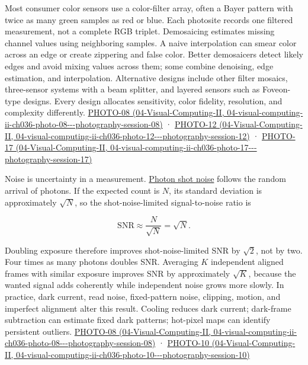 Most consumer color sensors use a color-filter array, often a Bayer pattern with twice as many green samples as red or blue. Each photosite records one filtered measurement, not a complete RGB triplet. Demosaicing estimates missing channel values using neighboring samples. A naive interpolation can smear color across an edge or create zippering and false color. Better demosaicers detect likely edges and avoid mixing values across them; some combine denoising, edge estimation, and interpolation. Alternative designs include other filter mosaics, three-sensor systems with a beam splitter, and layered sensors such as Foveon-type designs. Every design allocates sensitivity, color fidelity, resolution, and complexity differently. \href{../04-Visual-Computing-II/main.pdf\#nameddest=04-visual-computing-ii-ch036-photo-08---photography-session-08}{PHOTO-08 (04-Visual-Computing-II, 04-visual-computing-ii-ch036-photo-08-\/-\/-photography-session-08)} · \href{../04-Visual-Computing-II/main.pdf\#nameddest=04-visual-computing-ii-ch036-photo-12---photography-session-12}{PHOTO-12 (04-Visual-Computing-II, 04-visual-computing-ii-ch036-photo-12-\/-\/-photography-session-12)} · \href{../04-Visual-Computing-II/main.pdf\#nameddest=04-visual-computing-ii-ch036-photo-17---photography-session-17}{PHOTO-17 (04-Visual-Computing-II, 04-visual-computing-ii-ch036-photo-17-\/-\/-photography-session-17)}

Noise is uncertainty in a measurement. \hyperref[appendix-92d45cdf2afc]{Photon shot noise} follows the random arrival of photons. If the expected count is \(N\), its standard deviation is approximately \(\sqrt{N}\), so the shot-noise-limited signal-to-noise ratio is

\[
\mathrm{SNR}\approx\frac{N}{\sqrt{N}}=\sqrt{N}.
\]

Doubling exposure therefore improves shot-noise-limited SNR by \(\sqrt 2\), not by two. Four times as many photons doubles SNR. Averaging \(K\) independent aligned frames with similar exposure improves SNR by approximately \(\sqrt K\), because the wanted signal adds coherently while independent noise grows more slowly. In practice, dark current, read noise, fixed-pattern noise, clipping, motion, and imperfect alignment alter this result. Cooling reduces dark current; dark-frame subtraction can estimate fixed dark patterns; hot-pixel maps can identify persistent outliers. \href{../04-Visual-Computing-II/main.pdf\#nameddest=04-visual-computing-ii-ch036-photo-08---photography-session-08}{PHOTO-08 (04-Visual-Computing-II, 04-visual-computing-ii-ch036-photo-08-\/-\/-photography-session-08)} · \href{../04-Visual-Computing-II/main.pdf\#nameddest=04-visual-computing-ii-ch036-photo-10---photography-session-10}{PHOTO-10 (04-Visual-Computing-II, 04-visual-computing-ii-ch036-photo-10-\/-\/-photography-session-10)}


